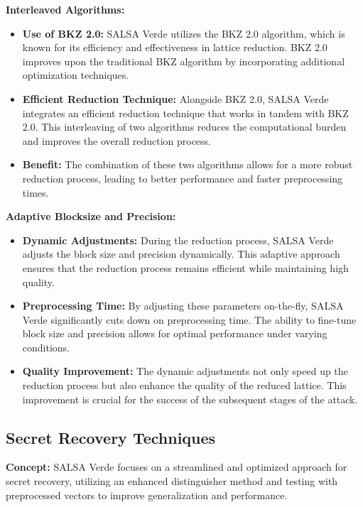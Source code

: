 \documentclass{article}
\begin{document}
\textbf{Interleaved Algorithms:}

\begin{itemize}
    \item \textbf{Use of BKZ 2.0:} SALSA Verde utilizes the BKZ 2.0 algorithm, which is known for its efficiency and effectiveness in lattice reduction. BKZ 2.0 improves upon the traditional BKZ algorithm by incorporating additional optimization techniques.
    \item \textbf{Efficient Reduction Technique:} Alongside BKZ 2.0, SALSA Verde integrates an efficient reduction technique that works in tandem with BKZ 2.0. This interleaving of two algorithms reduces the computational burden and improves the overall reduction process.
    \item \textbf{Benefit:} The combination of these two algorithms allows for a more robust reduction process, leading to better performance and faster preprocessing times.
\end{itemize}

\textbf{Adaptive Blocksize and Precision:}

\begin{itemize}
    \item \textbf{Dynamic Adjustments:} During the reduction process, SALSA Verde adjusts the block size and precision dynamically. This adaptive approach ensures that the reduction process remains efficient while maintaining high quality.
    \item \textbf{Preprocessing Time:} By adjusting these parameters on-the-fly, SALSA Verde significantly cuts down on preprocessing time. The ability to fine-tune block size and precision allows for optimal performance under varying conditions.
    \item \textbf{Quality Improvement:} The dynamic adjustments not only speed up the reduction process but also enhance the quality of the reduced lattice. This improvement is crucial for the success of the subsequent stages of the attack.
\end{itemize}

\subsection{Secret Recovery Techniques}

\textbf{Concept:} SALSA Verde focuses on a streamlined and optimized approach for secret recovery, utilizing an enhanced distinguisher method and testing with preprocessed vectors to improve generalization and performance.
\end{document}
